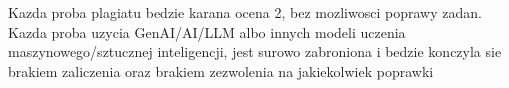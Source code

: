 \begin{infobox}[title=UWAGA]
\vspace*{\fill}
Kazda proba plagiatu bedzie karana ocena 2, bez mozliwosci poprawy zadan. Kazda proba uzycia GenAI/AI/LLM albo innych modeli uczenia maszynowego/sztucznej inteligencji, jest surowo zabroniona i bedzie konczyla sie brakiem zaliczenia oraz brakiem zezwolenia na jakiekolwiek poprawki
\vspace*{\fill}
\end{infobox}
